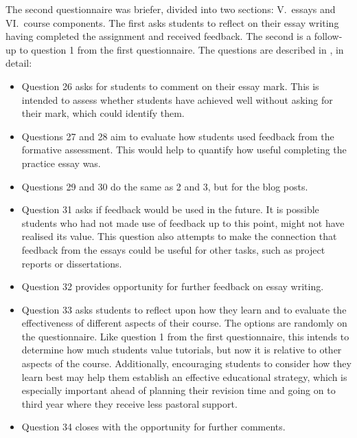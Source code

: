 The second questionnaire was briefer, divided into two sections: V.\ essays and VI.\ course components. The first asks students to reflect on their essay writing having completed the assignment and received feedback. The second is a follow-up to question 1 from the first questionnaire. The questions are described in , in detail:
\begin{itemize}
\item Question 26 asks for students to comment on their essay mark. This is intended to assess whether students have achieved well without asking for their mark, which could identify them.
\item Questions 27 and 28 aim to evaluate how students used feedback from the formative assessment. This would help to quantify how useful completing the practice essay was.
\item Questions 29 and 30 do the same as 2 and 3, but for the blog posts.
\item Question 31 asks if feedback would be used in the future. It is possible students who had not made use of feedback up to this point, might not have realised its value. This question also attempts to make the connection that feedback from the essays could be useful for other tasks, such as project reports or dissertations.
\item Question 32 provides opportunity for further feedback on essay writing.
\item Question 33 asks students to reflect upon how they learn and to evaluate the effectiveness of different aspects of their course. The options are randomly on the questionnaire. Like question 1 from the first questionnaire, this intends to determine how much students value tutorials, but now it is relative to other aspects of the course. Additionally, encouraging students to consider how they learn best may help them establish an effective educational strategy, which is especially important ahead of planning their revision time and going on to third year where they receive less pastoral support.
\item Question 34 closes with the opportunity for further comments.
\end{itemize}
